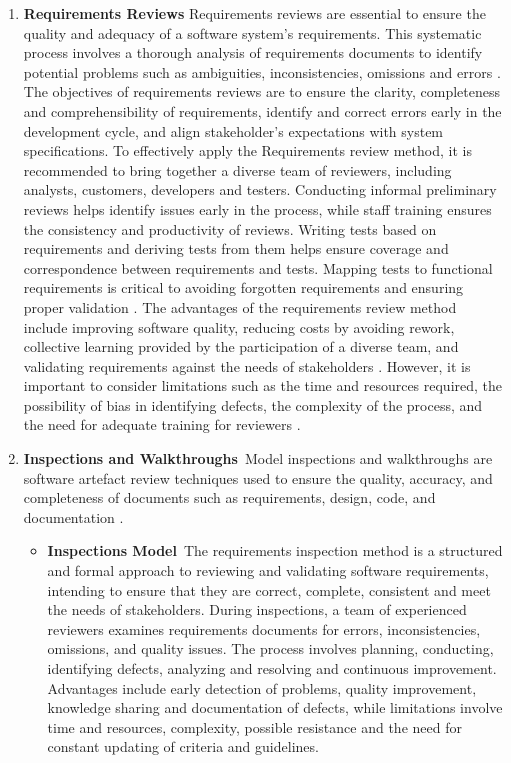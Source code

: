 \begin{enumerate}
 \item \textbf{Requirements Reviews} Requirements reviews are essential to ensure the quality and adequacy of a software system's requirements. This systematic process involves a thorough analysis of requirements documents to identify potential problems such as ambiguities, inconsistencies, omissions and errors \cite{Sommerville2016}. The objectives of requirements reviews are to ensure the clarity, completeness and comprehensibility of requirements, identify and correct errors early in the development cycle, and align stakeholder's expectations with system specifications.
 To effectively apply the Requirements review method, it is recommended to bring together a diverse team of reviewers, including analysts, customers, developers and testers. Conducting informal preliminary reviews helps identify issues early in the process, while staff training ensures the consistency and productivity of reviews. Writing tests based on requirements and deriving tests from them helps ensure coverage and correspondence between requirements and tests. Mapping tests to functional requirements is critical to avoiding forgotten requirements and ensuring proper validation \cite{Sommerville2016}.
 The advantages of the requirements review method include improving software quality, reducing costs by avoiding rework, collective learning provided by the participation of a diverse team, and validating requirements against the needs of stakeholders \cite {Sommerville2016}. However, it is important to consider limitations such as the time and resources required, the possibility of bias in identifying defects, the complexity of the process, and the need for adequate training for reviewers \cite{davis2013mastering}.
 \item \textbf{Inspections and Walkthroughs}\ Model inspections and walkthroughs are software artefact review techniques used to ensure the quality, accuracy, and completeness of documents such as requirements, design, code, and documentation \cite{davis2013mastering}. \begin{itemize} \item \textbf{Inspections Model}\ The requirements inspection method is a structured and formal approach to reviewing and validating software requirements, intending to ensure that they are correct, complete, consistent and meet the needs of stakeholders. During inspections, a team of experienced reviewers examines requirements documents for errors, inconsistencies, omissions, and quality issues. The process involves planning, conducting, identifying defects, analyzing and resolving and continuous improvement. Advantages include early detection of problems, quality improvement, knowledge sharing and documentation of defects, while limitations involve time and resources, complexity, possible resistance and the need for constant updating of criteria and guidelines.

\end{itemize}
\end{enumerate}
